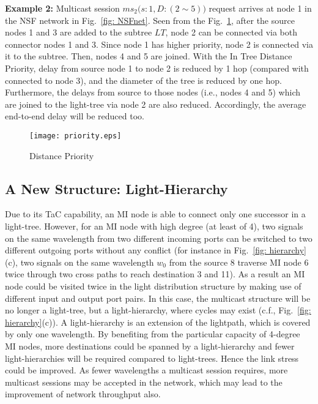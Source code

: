 \documentclass[conference]{IEEEtran}
\begin{document}
\textbf{Example 2:}
Multicast session $ms_{2}\big(s:1,D:(2\sim5)\big)$ request arrives at node 1 in the NSF network in Fig.~\ref{fig: NSFnet}. Seen from the Fig.~\ref{fig: priority}, after the source nodes 1 and 3 are added to the subtree $LT$, node 2 can be connected via both connector nodes 1 and 3.  Since node 1 has higher priority, node 2 is connected via it to the subtree. Then, nodes 4 and 5 are joined. With the In Tree Distance Priority, delay from source node 1 to node 2 is reduced by 1 hop (compared with connected to node 3), and the diameter of the tree is reduced by one hop. Furthermore, the delays from source to those nodes (i.e., nodes 4 and 5) which are joined to the light-tree via node 2 are also reduced. Accordingly, the average end-to-end delay will be reduced too.

\begin{figure}
        \centering
        \texttt{[image: priority.eps]}
        \caption{Distance Priority}
        \label{fig: priority}
\end{figure}

\subsection{A New Structure: Light-Hierarchy}
\label{subsec:Edge Disjoint Path Routing Algorithm}
Due to its TaC capability, an MI node is able to connect only one successor in a light-tree. However, for an MI node with high degree (at least of 4), two signals on the same wavelength from two different incoming ports can be switched to two different outgoing ports without any conflict (for instance in Fig.~\ref{fig: hierarchy}(c), two signals on the same wavelength $w_{0}$ from the source 8 traverse MI node 6 twice through two cross paths to reach destination 3 and 11). As a result an MI node could be visited twice in the light distribution structure by making use of different input and output port pairs. In this case, the multicast structure will be no longer a light-tree, but a light-hierarchy, where cycles may exist (c.f., Fig.~\ref{fig: hierarchy}(c)). A light-hierarchy is an extension of the lightpath, which is covered by only one wavelength. By benefiting from the particular capacity of 4-degree MI nodes, more destinations could be spanned by a light-hierarchy and fewer light-hierarchies will be required compared to light-trees. Hence the link stress could be improved. As fewer wavelengths a multicast session requires, more multicast sessions may be accepted in the network, which may lead to the improvement of network throughput also.
\end{document}
